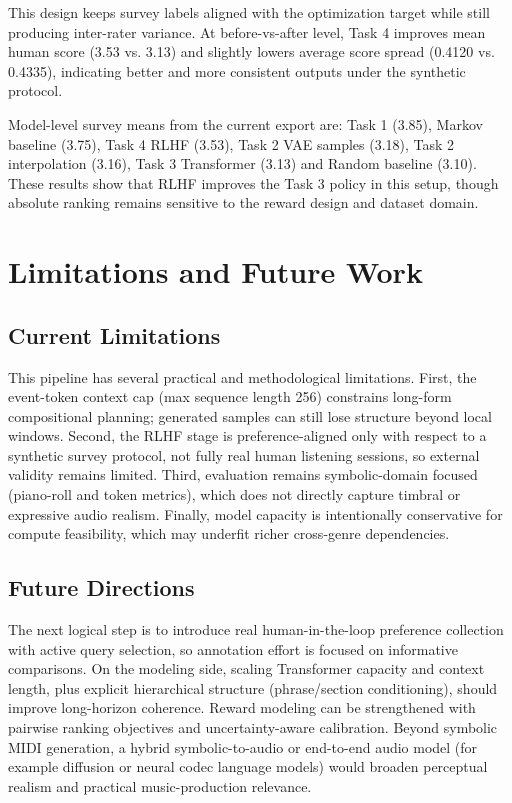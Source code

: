 \documentclass[conference]{IEEEtran}
\begin{document}
This design keeps survey labels aligned with the optimization target while still producing inter-rater variance. At before-vs-after level, Task 4 improves mean human score (3.53 vs. 3.13) and slightly lowers average score spread (0.4120 vs. 0.4335), indicating better and more consistent outputs under the synthetic protocol.

Model-level survey means from the current export are: Task 1 (3.85), Markov baseline (3.75), Task 4 RLHF (3.53), Task 2 VAE samples (3.18), Task 2 interpolation (3.16), Task 3 Transformer (3.13) and Random baseline (3.10). These results show that RLHF improves the Task 3 policy in this setup, though absolute ranking remains sensitive to the reward design and dataset domain.

\section{Limitations and Future Work}
\subsection{Current Limitations}
This pipeline has several practical and methodological limitations. First, the event-token context cap (max sequence length 256) constrains long-form compositional planning; generated samples can still lose structure beyond local windows. Second, the RLHF stage is preference-aligned only with respect to a synthetic survey protocol, not fully real human listening sessions, so external validity remains limited. Third, evaluation remains symbolic-domain focused (piano-roll and token metrics), which does not directly capture timbral or expressive audio realism. Finally, model capacity is intentionally conservative for compute feasibility, which may underfit richer cross-genre dependencies.

\subsection{Future Directions}
The next logical step is to introduce real human-in-the-loop preference collection with active query selection, so annotation effort is focused on informative comparisons. On the modeling side, scaling Transformer capacity and context length, plus explicit hierarchical structure (phrase/section conditioning), should improve long-horizon coherence. Reward modeling can be strengthened with pairwise ranking objectives and uncertainty-aware calibration. Beyond symbolic MIDI generation, a hybrid symbolic-to-audio or end-to-end audio model (for example diffusion or neural codec language models) would broaden perceptual realism and practical music-production relevance.
\end{document}
